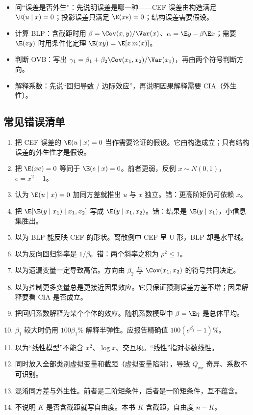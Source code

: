 \begin{itemize}
  \item 问“误差是否外生”：先说明误差是哪一种——CEF 误差由构造满足 $\E(u\mid x)=0$；投影误差只满足 $\E(xe)=0$；结构误差需要假设。
  \item 计算 BLP：含截距时用 $\beta=\Cov(x,y)/\Var(x)$、$\alpha=\E y-\beta\E x$；需要 $\E(xy)$ 时用条件化定理 $\E(xy)=\E[x\,m(x)]$。
  \item 判断 OVB：写出 $\gamma_1=\beta_1+\beta_2\Cov(x_1,x_2)/\Var(x_1)$，再由两个符号判断方向。
  \item 解释系数：先说“回归导数 / 边际效应”，再说明因果解释需要 CIA（外生性）。
\end{itemize}

\subsection{常见错误清单}

\begin{enumerate}[label=(\arabic*)]
  \item 把 CEF 误差的 $\E(u\mid x)=0$ 当作需要论证的假设。它由构造成立；只有结构误差的外生性才是假设。
  \item 把 $\E(xe)=0$ 等同于 $\E(e\mid x)=0$。前者更弱，反例 $x\sim N(0,1)$，$e=x^2-1$。
  \item 认为 $\E(u\mid x)=0$ 加同方差就推出 $u$ 与 $x$ 独立。错：更高阶矩仍可依赖 $x$。
  \item 把 $\E[\E(y\mid x_1)\mid x_1,x_2]$ 写成 $\E(y\mid x_1,x_2)$。错：结果是 $\E(y\mid x_1)$，小信息集胜出。
  \item 以为 BLP 能反映 CEF 的形状。离散例中 CEF 呈 U 形，BLP 却是水平线。
  \item 以为反向回归斜率是 $1/\beta$。错：两个斜率之积为 $\rho^2\le1$。
  \item 以为遗漏变量一定导致高估。方向由 $\beta_2$ 与 $\Cov(x_1,x_2)$ 的符号共同决定。
  \item 以为控制更多变量总是更接近因果效应。它只保证预测误差方差不增；因果解释要看 CIA 是否成立。
  \item 把回归系数解释为某个个体的效应。随机系数模型中 $\beta=\E\eta$ 是总体平均。
  \item $\beta_1$ 较大时仍用 $100\beta_1\%$ 解释半弹性。应报告精确值 $100(e^{\beta_1}-1)\%$。
  \item 以为“线性模型”不能含 $x^2$、$\log x$、交互项。“线性”指对参数线性。
  \item 同时放入全部类别虚拟变量和截距（虚拟变量陷阱），导致 $Q_{xx}$ 奇异、系数不可识别。
  \item 混淆同方差与外生性。前者是二阶矩条件，后者是一阶矩条件，互不蕴含。
  \item 不说明 $K$ 是否含截距就写自由度。本书 $K$ 含截距，自由度 $n-K$。
\end{enumerate}

